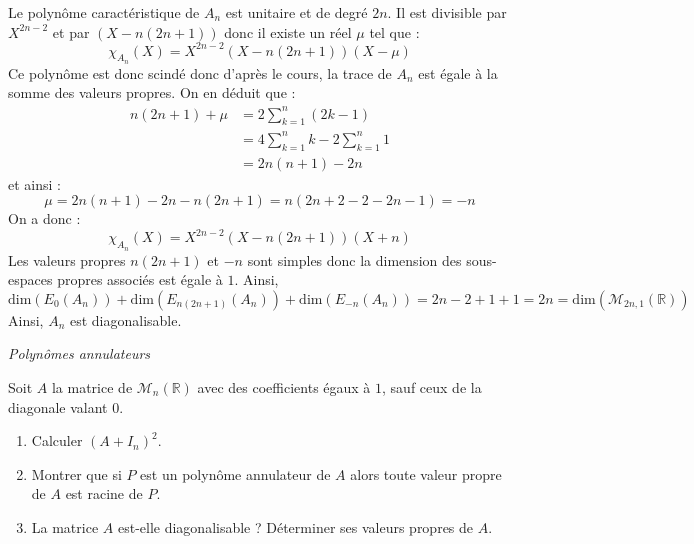 \documentclass[a4paper,10pt]{report}
\begin{document}
\begin{enumerate}
\noindent Le polynôme caractéristique de $A_n$ est unitaire et de degré $2n$. Il est divisible par $X^{2n-2}$ et par $(X- n(2n+1))$ donc il existe un réel $\mu$ tel que :
$$ \chi_{A_n}(X) = X^{2n-2} (X- n(2n+1)) (X- \mu)$$
Ce polynôme est donc scindé donc d'après le cours, la trace de $A_n$ est égale à la somme des valeurs propres. On en déduit que :
\begin{align*}
 n(2n+1) + \mu & = 2 \sum_{k=1}^n (2k-1) \\
 & = 4 \sum_{k=1}^n k - 2 \sum_{k=1}^n 1 \\
 & = 2n(n+1) -2n 
 \end{align*}
 et ainsi :
 $$ \mu = 2n(n+1)-2n-n(2n+1) = n(2n+2-2-2n-1) = -n$$
 On a donc :
 $$  \chi_{A_n}(X) = X^{2n-2} (X- n(2n+1)) (X+n)$$
 Les valeurs propres $n(2n+1)$ et $-n$ sont simples donc la dimension des sous-espaces propres associés est égale à $1$. Ainsi,
 $$ \textrm{dim}(E_0(A_n))+ \textrm{dim}(E_{n(2n+1)}(A_n))+ \textrm{dim}(E_{-n}(A_n)) = 2n-2+1+1=2n = \textrm{dim}(\mathcal{M}_{2n,1}(\mathbb{R}))$$
Ainsi, $A_n$ est diagonalisable.
\end{enumerate}

\medskip

\begin{center}
\textit{{ {\large Polynômes annulateurs}}}
\end{center}

\medskip

\begin{Exa} Soit $A$ la matrice de $\mathcal{M}_n(\mathbb{R})$ avec des coefficients égaux à $1$, sauf ceux de la diagonale valant $0$.

\begin{enumerate}
\item Calculer $(A+I_n)^2$.
\item Montrer que si $P$ est un polynôme annulateur de $A$ alors toute valeur propre de $A$ est racine de $P$.
\item La matrice $A$ est-elle diagonalisable ? Déterminer ses valeurs propres de $A$. 
\end{enumerate}
\end{Exa}
\end{document}
